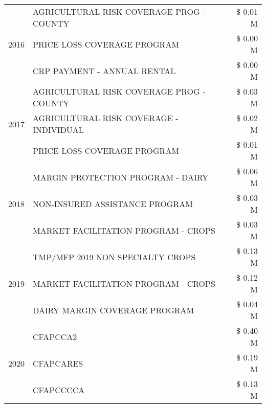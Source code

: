 \begin{tabular}{llr}
\multirow[t]{3}{*}{2016} & AGRICULTURAL RISK COVERAGE PROG - COUNTY & \$ 0.01 M \\
 & PRICE LOSS COVERAGE PROGRAM & \$ 0.00 M \\
 & CRP PAYMENT - ANNUAL RENTAL & \$ 0.00 M \\
\cline{1-3}
\multirow[t]{3}{*}{2017} & AGRICULTURAL RISK COVERAGE PROG - COUNTY & \$ 0.03 M \\
 & AGRICULTURAL RISK COVERAGE - INDIVIDUAL & \$ 0.02 M \\
 & PRICE LOSS COVERAGE PROGRAM & \$ 0.01 M \\
\cline{1-3}
\multirow[t]{3}{*}{2018} & MARGIN PROTECTION PROGRAM - DAIRY & \$ 0.06 M \\
 & NON-INSURED ASSISTANCE PROGRAM & \$ 0.03 M \\
 & MARKET FACILITATION PROGRAM - CROPS & \$ 0.03 M \\
\cline{1-3}
\multirow[t]{3}{*}{2019} & TMP/MFP 2019 NON SPECIALTY CROPS & \$ 0.13 M \\
 & MARKET FACILITATION PROGRAM - CROPS & \$ 0.12 M \\
 & DAIRY MARGIN COVERAGE PROGRAM & \$ 0.04 M \\
\cline{1-3}
\multirow[t]{3}{*}{2020} & CFAPCCA2 & \$ 0.40 M \\
 & CFAPCARES & \$ 0.19 M \\
 & CFAPCCCCA & \$ 0.13 M \\
\cline{1-3}
\bottomrule
\end{tabular}
